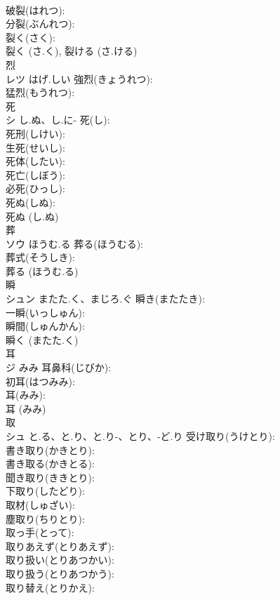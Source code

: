 \documentclass[8pt]{extreport}
\begin{document}
\begin{CJK}{UTF8}{min}
\\	破裂(はれつ): 
\\	分裂(ぶんれつ): 
\\	裂く(さく): 
\\	裂く (さ.く), 裂ける (さ.ける)
\\	烈			
\\	レツ	はげ.しい	強烈(きょうれつ): 
\\	猛烈(もうれつ): 
\\	死			
\\	シ	し.ぬ、し.に-	死(し): 
\\	死刑(しけい): 
\\	生死(せいし): 
\\	死体(したい): 
\\	死亡(しぼう): 
\\	必死(ひっし): 
\\	死ぬ(しぬ): 
\\	死ぬ (し.ぬ)
\\	葬			
\\	ソウ	ほうむ.る	葬る(ほうむる): 
\\	葬式(そうしき): 
\\	葬る (ほうむ.る)
\\	瞬			
\\	シュン	またた.く、まじろ.ぐ	瞬き(またたき): 
\\	一瞬(いっしゅん): 
\\	瞬間(しゅんかん): 
\\	瞬く (またた.く)
\\	耳			
\\	ジ	みみ	耳鼻科(じびか): 
\\	初耳(はつみみ): 
\\	耳(みみ): 
\\	耳 (みみ)
\\	取			
\\	シュ	と.る、と.り、と.り-、とり、-ど.り	受け取り(うけとり): 
\\	書き取り(かきとり): 
\\	書き取る(かきとる): 
\\	聞き取り(ききとり): 
\\	下取り(したどり): 
\\	取材(しゅざい): 
\\	塵取り(ちりとり): 
\\	取っ手(とって): 
\\	取りあえず(とりあえず): 
\\	取り扱い(とりあつかい): 
\\	取り扱う(とりあつかう): 
\\	取り替え(とりかえ): 

\end{CJK}
\end{document}
